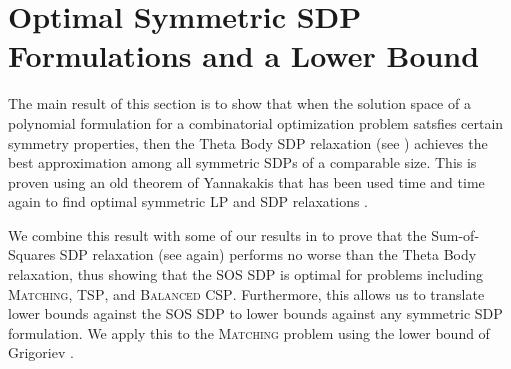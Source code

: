 \chapter{Optimal Symmetric SDP Formulations and a Lower Bound}\label{cha:symmetric_sdps}
The main result of this section is to show that when the solution space of a polynomial formulation for a combinatorial optimization problem satsfies certain symmetry properties, then the Theta Body SDP relaxation (see ) achieves the best approximation among all symmetric SDPs of a comparable size. This is proven using an old theorem of Yannakakis that has been used time and time again to find optimal symmetric LP and SDP relaxations \cite{TODO}. 

We combine this result with some of our results in  to prove that the Sum-of-Squares SDP relaxation (see  again) performs no worse than the Theta Body relaxation, thus showing that the SOS SDP is optimal for problems including \textsc{Matching}, \textsc{TSP}, and \textsc{Balanced CSP}. Furthermore, this allows us to translate lower bounds against the SOS SDP to lower bounds against any symmetric SDP formulation. We apply this to the \textsc{Matching} problem using the lower bound of Grigoriev \cite{TODO}.

